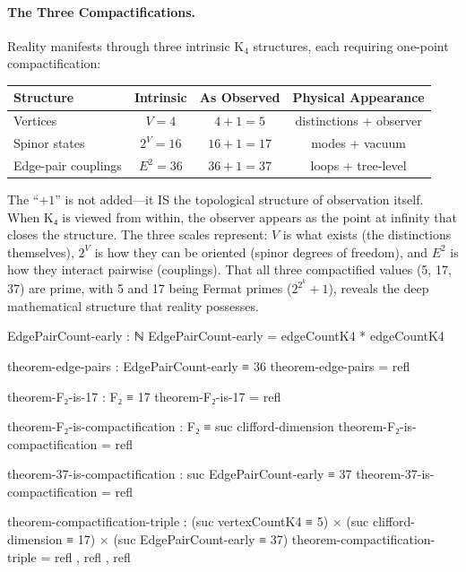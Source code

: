 \documentclass[11pt,a4paper]{book}
\begin{document}
\paragraph{The Three Compactifications.}
Reality manifests through three intrinsic K$_4$ structures, each requiring one-point compactification:

\begin{center}
\begin{tabular}{lccc}
\hline
\textbf{Structure} & \textbf{Intrinsic} & \textbf{As Observed} & \textbf{Physical Appearance} \\
\hline
Vertices           & $V = 4$       & $4 + 1 = 5$           & distinctions + observer \\
Spinor states      & $2^V = 16$    & $16 + 1 = 17$         & modes + vacuum \\
Edge-pair couplings& $E^2 = 36$    & $36 + 1 = 37$         & loops + tree-level \\
\hline
\end{tabular}
\end{center}

The ``$+1$'' is not added—it IS the topological structure of observation itself. When K₄ 
is viewed from within, the observer appears as the point at infinity that closes the structure. 
The three scales represent: $V$ is what exists (the distinctions themselves), $2^V$ 
is how they can be oriented (spinor degrees of freedom), and $E^2$ is how they 
interact pairwise (couplings). That all three compactified values (5, 17, 37) are prime, 
with 5 and 17 being Fermat primes ($2^{2^k} + 1$), reveals the deep mathematical 
structure that reality possesses.

\begin{code}
EdgePairCount-early : ℕ
EdgePairCount-early = edgeCountK4 * edgeCountK4

theorem-edge-pairs : EdgePairCount-early ≡ 36
theorem-edge-pairs = refl

theorem-F₂-is-17 : F₂ ≡ 17
theorem-F₂-is-17 = refl

theorem-F₂-is-compactification : F₂ ≡ suc clifford-dimension
theorem-F₂-is-compactification = refl

theorem-37-is-compactification : suc EdgePairCount-early ≡ 37
theorem-37-is-compactification = refl

theorem-compactification-triple : 
  (suc vertexCountK4 ≡ 5) × (suc clifford-dimension ≡ 17) × (suc EdgePairCount-early ≡ 37)
theorem-compactification-triple = refl , refl , refl
\end{code}
\end{document}
